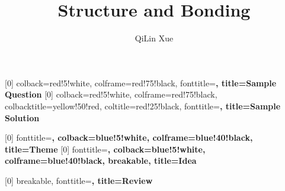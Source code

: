 \documentclass{article}
\title{Structure and Bonding}
\author{QiLin Xue}
\date{ }
\numberwithin{equation}{section}
\theoremstyle{classic}
\begin{document}
[0]{
    colback=red!5!white,
    colframe=red!75!black,
    fonttitle=\bfseries,
    title=Sample Question
}
[0]{
    colback=red!5!white,
    colframe=red!75!black,
    colbacktitle=yellow!50!red,
    coltitle=red!25!black,
    fonttitle=\bfseries,
    title=Sample Solution
}

[0]{
    fonttitle=\bfseries,
    colback=blue!5!white,
    colframe=blue!40!black,
    title=Theme
}
[0]{
    fonttitle=\bfseries,
    colback=blue!5!white,
    colframe=blue!40!black,
    breakable,
    title=Idea
}

[0]{
    breakable,
    fonttitle=\bfseries,
    title=Review
}

\maketitle

\tableofcontents
\newpage
\end{document}
